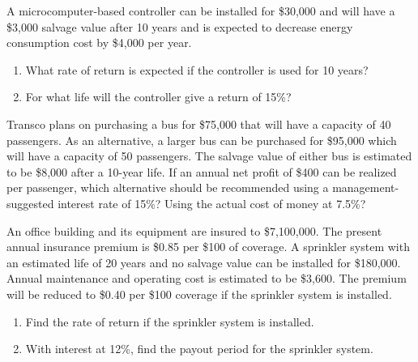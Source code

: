 \begin{exercises}
    \begin{exercise}
    \label{sea-08-12}
        A microcomputer-based controller can be installed for \$30,000 and will have a \$3,000 salvage value after 10 years and is expected to decrease energy consumption cost by \$4,000 per year.
        \begin{enumerate}[label=\alph*)]
            \item What rate of return is expected if the controller is used for 10 years?
            \item For what life will the controller give a return of 15\%?
        \end{enumerate}
    \end{exercise}
    \begin{solution}
    \end{solution}
    
    \begin{exercise}
    \label{sea-08-13}
        Transco plans on purchasing a bus for \$75,000 that will have a capacity of 40 passengers. As an alternative, a larger bus can be purchased for \$95,000 which will have a capacity of 50 passengers. The salvage value of either bus is estimated to be \$8,000 after a 10-year life. If an annual net profit of \$400 can be realized per passenger, which alternative should be recommended using a management-suggested interest rate of 15\%? Using the actual cost of money at 7.5\%?
    \end{exercise}
    \begin{solution}
    \end{solution}
    
    \begin{exercise}
    \label{sea-08-14}
        An office building and its equipment are insured to \$7,100,000. The present annual insurance premium is \$0.85 per \$100 of coverage. A sprinkler system with an estimated life of 20 years and no salvage value can be installed for \$180,000. Annual maintenance and operating cost is estimated to be \$3,600. The premium will be reduced to \$0.40 per \$100 coverage if the sprinkler system is installed.
        \begin{enumerate}[label=\alph*)]
            \item Find the rate of return if the sprinkler system is installed.
            \item With interest at 12\%, find the payout period for the sprinkler system.
        \end{enumerate}
    \end{exercise}
    \begin{solution}
    \end{solution}
    

\end{exercises}
